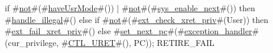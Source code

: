 if   #\hyperref[sailRISCVznot]{not}#(#\hyperref[sailRISCVzhaveUsrMode]{haveUsrMode}#()) | #\hyperref[sailRISCVznot]{not}#(#\hyperref[sailRISCVzsyszyenablezynext]{sys\_enable\_next}#())
then #\hyperref[sailRISCVzhandlezyillegal]{handle\_illegal}#()
else if #\hyperref[sailRISCVznot]{not}#(#\hyperref[sailRISCVzextzycheckzyxretzypriv]{ext\_check\_xret\_priv}#(User))
then #\hyperref[sailRISCVzextzyfailzyxretzypriv]{ext\_fail\_xret\_priv}#()
else #\hyperref[sailRISCVzsetzynextzypc]{set\_next\_pc}#(#\hyperref[sailRISCVzexceptionzyhandler]{exception\_handler}#(cur_privilege, #\hyperref[sailRISCVzCTLzyURET]{CTL\_URET}#(), PC));
RETIRE_FAIL
